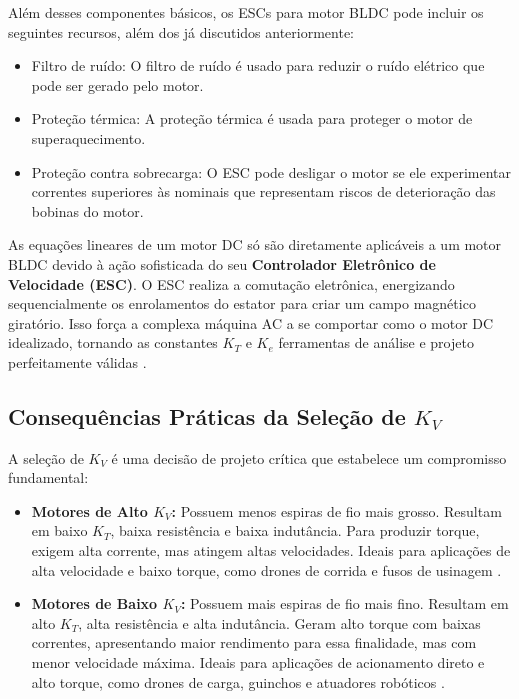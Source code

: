  Além desses componentes básicos, os ESCs para motor BLDC pode incluir os seguintes recursos, além dos já discutidos anteriormente: 

 \begin{itemize} 
 \item Filtro de ruído: O filtro de ruído é usado para reduzir o ruído elétrico que pode ser gerado pelo motor. 
 \item Proteção térmica: A proteção térmica é usada para proteger o motor de superaquecimento. 
 \item Proteção contra sobrecarga: O ESC pode desligar o motor se ele experimentar correntes superiores às nominais que representam riscos de deterioração das bobinas do motor. 
 \end{itemize} 

  As equações lineares de um motor DC só são diretamente aplicáveis a um motor BLDC devido à ação sofisticada do seu \textbf{Controlador Eletrônico de Velocidade (ESC)}. O ESC realiza a comutação eletrônica, energizando sequencialmente os enrolamentos do estator para criar um campo magnético giratório. Isso força a complexa máquina AC a se comportar como o motor DC idealizado, tornando as constantes $K_T$ e $K_e$ ferramentas de análise e projeto perfeitamente válidas \parencite{hendershot1994design}.

 \subsection{Consequências Práticas da Seleção de $K_V$} 

 A seleção de $K_V$ é uma decisão de projeto crítica que estabelece um compromisso fundamental: 
 \begin{itemize} 
 \item \textbf{Motores de Alto $K_V$:} Possuem menos espiras de fio mais grosso. Resultam em baixo $K_T$, baixa resistência e baixa indutância. Para produzir torque, exigem alta corrente, mas atingem altas velocidades. Ideais para aplicações de alta velocidade e baixo torque, como drones de corrida e fusos de usinagem \parencite{tmotor2019kv}. 
 \item \textbf{Motores de Baixo $K_V$:} Possuem mais espiras de fio mais fino. Resultam em alto $K_T$, alta resistência e alta indutância. Geram alto torque com baixas correntes, apresentando maior rendimento para essa finalidade, mas com menor velocidade máxima. Ideais para aplicações de acionamento direto e alto torque, como drones de carga, guinchos e atuadores robóticos \parencite{byod2018kv}. 
 \end{itemize} 


